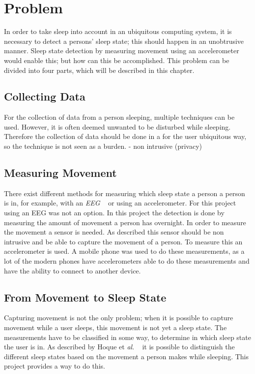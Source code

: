 \chapter{Problem} %
\label{cha:problem}
In order to take sleep into account in an ubiquitous computing system, it is necessary to detect a persons' sleep state; this should happen in an unobtrusive manner. Sleep state detection by measuring movement using an accelerometer would enable this; but how can this be accomplished. This problem can be divided into four parts, which will be described in this chapter.

\section{Collecting Data} %
\label{sec:collecting_data}
For the collection of data from a person sleeping, multiple techniques can be used. However, it is often deemed unwanted to be disturbed while sleeping. Therefore the collection of data should be done in a for the user ubiquitous way, so the technique is not seen as a burden.
- non intrusive (privacy)

\section{Measuring Movement} %
\label{sec:measuring_movement}
There exist different methods for measuring which sleep state a person a person is in, for example, with an \emph{EEG} ~\cite{Itil196976} or using an accelerometer. For this project using an EEG was not an option. In this project the detection is done by measuring the amount of movement a person has overnight. In order to measure the movement a sensor is needed. As described this sensor should be non intrusive and be able to capture the movement of a person. To measure this an accelerometer is used. A mobile phone was used to do these measurements, as a lot of the modern phones have accelerometers able to do these measurements and have the ability to connect to another device.


\section{From Movement to Sleep State} %
\label{sec:translate_movement_patterns_to_sleep_states}
Capturing movement is not the only problem; when it is possible to capture movement while a user sleeps, this movement is not yet a sleep state. The measurements have to be classified in some way, to determine in which sleep state the user is in. As described by Hoque et \emph{al}. ~\cite{Hoque:2010:MBP:1921081.1921088} it is possible to distinguish the different sleep states based on the movement a person makes while sleeping. This project provides a way to do this.

